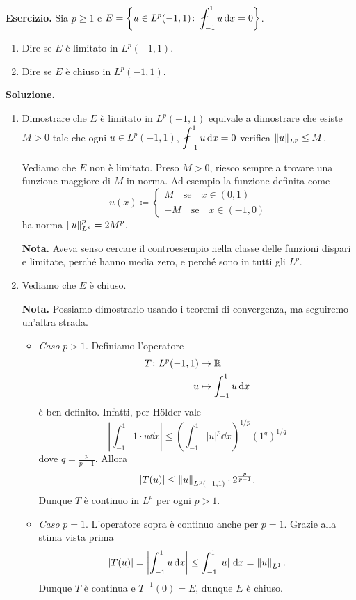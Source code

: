\textbf{Esercizio.} Sia $p \geq 1$ e $\ds E = \left\{ u \in L^p(-1,1) \colon \fint_{-1}^1 u \dd x = 0 \right\}$.

\begin{enumerate}
\item Dire se $E$ è limitato in $L^p(-1,1)$.

\item Dire se $E$ è chiuso in $L^p(-1,1)$.
\end{enumerate}

\textbf{Soluzione.}
\begin{enumerate}
\item Dimostrare che $E$ è limitato in $L^p(-1,1)$ equivale a dimostrare che esiste $M > 0$ tale che ogni  $u \in L^p(-1,1)$, $\ds \fint_{-1}^1 u \dd x = 0$ verifica $\left\lVert u \right\rVert_{L^p} \leq M$.

Vediamo che $E$ non è limitato.
Preso $M > 0$, riesco sempre a trovare una funzione maggiore di $M$ in norma.
Ad esempio la funzione definita come
%
$$
u(x) \coloneqq
\begin{cases}
M \quad \text{se} \quad x \in (0,1) \\
-M \quad \text{se} \quad x \in (-1,0)
\end{cases} 
$$
%
ha norma $\displaystyle \left\lVert u \right\rVert_{L^p}^p = 2 M^p$.

\textbf{Nota.} Aveva senso cercare il controesempio nella classe delle funzioni dispari e limitate, perché hanno media zero, e perché sono in tutti gli $L^p$.

\item Vediamo che $E$ è chiuso.

\textbf{Nota.} Possiamo dimostrarlo usando i teoremi di convergenza, ma seguiremo un'altra strada.

\begin{itemize}
\item \textit{Caso} $p > 1$. Definiamo l'operatore 
\begin{align*}
T \colon L^p(-1,1) & \to \mathbb R \\
u & \mapsto \int_{-1}^{1} u \,\mathrm{d} x 
\end{align*}
è ben definito.
Infatti, per Hölder vale
%
$$
\left| \int_{-1}^{1} 1 \cdot u \dd x  \right| \leq \left( \int_{-1}^{1} \left| u \right|^p \dd x  \right)^{1/p} \left( 1^q \right)^{1/q}
$$
%
dove $q = \frac{p}{p-1}$.
Allora
$$
\left| T(u) \right| \leq \left\lVert u \right\rVert_{L^p(-1,1)} \cdot 2^{\frac{p}{p-1}}.
$$
%
Dunque $T$ è continuo in $L^p$ per ogni $p > 1$.

\item \textit{Caso} $p = 1$. L'operatore sopra è continuo anche per $p = 1$. Grazie alla stima vista prima
%
$$
\left| T(u) \right| = \left| \int_{-1}^{1} u \,\mathrm{d} x  \right| \leq \int_{-1}^{1} \left| u \right| \,\mathrm{d} x = \left\lVert u \right\rVert_{L^1}.
$$
%
Dunque $T$ è continua e $T^{-1}(0) = E$, dunque $E$ è chiuso.

\end{itemize}

\end{enumerate}

